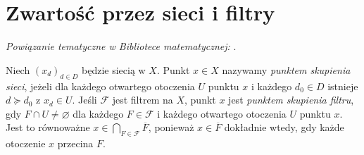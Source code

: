 \section{Zwartość przez sieci i filtry}
\label{sec:topog-zwartosc-zbieznosc}

\noindent\emph{Powiązanie tematyczne w Bibliotece matematycznej:} .


\begin{definicja}
\label{def:topog-zwartosc-punkt-skupienia}
Niech $(x_d)_{d\in D}$ będzie siecią w $X$.
Punkt $x\in X$ nazywamy \emph{punktem skupienia sieci},
jeżeli dla każdego otwartego otoczenia $U$ punktu $x$
i każdego $d_0\in D$ istnieje $d\succeq d_0$
z $x_d\in U$.
Jeśli $\mathcal F$ jest filtrem na $X$, punkt $x$
jest \emph{punktem skupienia filtru}, gdy
$F\cap U\ne\varnothing$ dla każdego
$F\in\mathcal F$ i każdego otwartego otoczenia $U$
punktu $x$. Jest to równoważne
$x\in\bigcap_{F\in\mathcal F}\overline F$,
ponieważ $x\in\overline F$ dokładnie wtedy,
gdy każde otoczenie $x$ przecina $F$.
\end{definicja}

